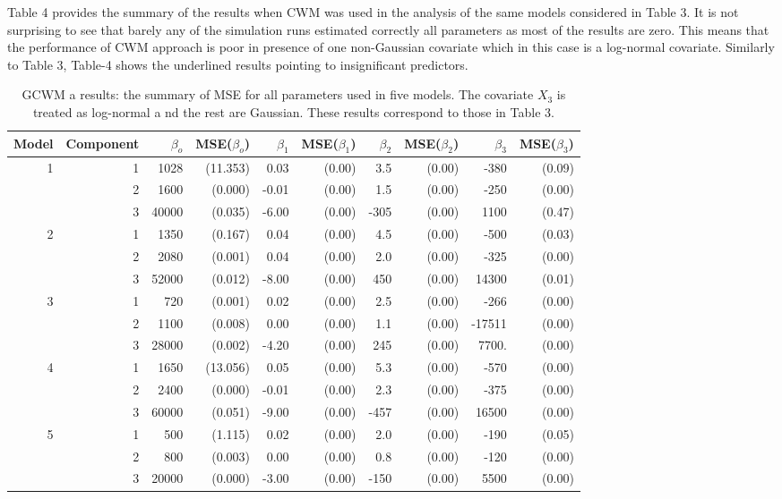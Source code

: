 \documentclass[11pt,letterpaper]{article}
\numberwithin{equation}{section}
\numberwithin{equation}{section}
\numberwithin{equation}{section}
\begin{document}
Table 4 provides the summary of the results when CWM was used in the analysis of the same models considered in Table 3. It is not surprising to see that barely any of the simulation runs estimated correctly all parameters as most of the results are zero. This means that the performance of CWM approach is poor in presence of one non-Gaussian covariate which in this case is a log-normal covariate. Similarly to Table 3, Table-4 shows the underlined results pointing to insignificant predictors.

\begin{table}[!htb]
\centering
\caption{ GCWM a results: the summary of MSE for all parameters used in five models. The covariate $X_3$ is treated as log-normal a nd the rest are Gaussian. These results correspond to those in Table 3.}
\label{my-label}
\begin{tabular}{rrrrrrrrrr}
\hline\hline
Model & Component & $\beta_o$ &  MSE($\beta_o$)   &  $\beta_1$ & MSE($\beta_1$)& $\beta_2$ &MSE($\beta_2$)   & $\beta_3$ &  MSE($\beta_3$)  \\
\hline
1     & 1         & 1028& (11.353)   & 0.03& (0.00)  & 3.5& (0.00)    & -380& (0.09)   \\
      & 2         & 1600& (0.000)     & -0.01&(0.00) & 1.5&(0.00)    & -250&(0.00)   \\
      & 3         & 40000&(0.035)    & -6.00&(0.00) & -305&(0.00) & 1100&(0.47)   \\
2     & 1         & 1350&(0.167)     & 0.04&(0.00)  & 4.5&(0.00)    & -500&(0.03)   \\
      & 2         & 2080& (0.001)     & 0.04&(0.00)  & 2.0&(0.00)    & -325&(0.00)   \\
      & 3         & 52000& (0.012)    & -8.00&(0.00) & 450&(0.00)  & 14300&(0.01)  \\
3     & 1         & 720& (0.001)      & 0.02&(0.00)  & 2.5&(0.00)   & -266&(0.00)   \\
      & 2         & 1100& (0.008)     & 0.00&(0.00)  & 1.1&(0.00)    & -17511&(0.00) \\
      & 3         & 28000& (0.002)    & -4.20&(0.00) & 245&(0.00)  & 7700.&(0.00) \\
4     & 1         & 1650&(13.056)   & 0.05&(0.00)  & 5.3&(0.00)    & -570&(0.00)   \\
      & 2         & 2400& (0.000)     & -0.01&(0.00) & 2.3&(0.00)    & -375&(0.00)   \\
      & 3         & 60000& (0.051)    & -9.00&(0.00) & -457&(0.00) & 16500&(0.00)  \\
5     & 1         & 500& (1.115)     & 0.02&(0.00)  & 2.0&(0.00)    & -190&(0.05)   \\
      & 2         & 800& (0.003)      & 0.00&(0.00)  & 0.8&(0.00)    & -120&(0.00)   \\
      & 3         & 20000& (0.000)    & -3.00&(0.00) & -150&(0.00) & 5500&(0.00)  \\
      \hline\hline
\end{tabular}

\end{table}
\end{document}
